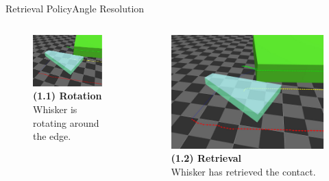 \documentclass[AIRbeamer
,optEnglish
,optBiber
,optBibstyleAlphabetic
,optBeamerClassicFormat%
]{AIRlatex}
\begin{document}
    \begin{frame}[c]{Retrieval Policy}{Angle Resolution}
        \begin{columns}[T,onlytextwidth]
            \begin{column}[T]{0.48\textwidth}
                \begin{figure}[H]
                    \centering
                    \captionsetup{justification=centering}
                    \includegraphics[width=\textwidth]{figures/retrieval/mid-retrieval}
                    \caption{\textbf{(1.1) Rotation}\\Whisker is rotating around the edge.}
                \end{figure}

            \end{column}
            \begin{column}[T]{0.48\textwidth}
                \begin{figure}[H]
                    \centering
                    \captionsetup{justification=centering}
                    \includegraphics[width=\textwidth]{figures/retrieval/retrieval}
                    \caption{\textbf{(1.2) Retrieval}\\Whisker has retrieved the contact.}
                \end{figure}
            \end{column}
        \end{columns}
    \end{frame}
\end{document}
